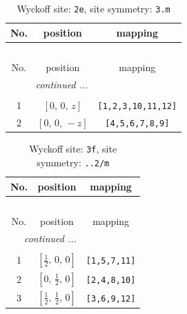 \documentclass[fleqn,8pt]{jsarticle}
\begin{document}
\begin{longtable}{ccc}
\caption{Wyckoff site: {\tt 2e}, site symmetry: {\tt 3.m}}
 \\
 \hline \hline
No. & position & mapping \\ \hline \endfirsthead

\multicolumn{2}{l}{\tablename\ \thetable{}} \\
 \hline \hline
No. & position & mapping \\ \hline \endhead

 \hline \hline
\multicolumn{2}{r}{\footnotesize\it continued ...} \\ \endfoot

 \hline \hline
\multicolumn{2}{r}{} \\ \endlastfoot

1 & $\left[ 0,\, 0,\, z \right]$ & {\tt [1,2,3,10,11,12]} \\ \hline
2 & $\left[ 0,\, 0,\, - z \right]$ & {\tt [4,5,6,7,8,9]} \\
\end{longtable}
\renewcommand{\arraystretch}{1.2}
\begin{longtable}{ccc}
\caption{Wyckoff site: {\tt 3f}, site symmetry: {\tt ..2/m}}
 \\
 \hline \hline
No. & position & mapping \\ \hline \endfirsthead

\multicolumn{2}{l}{\tablename\ \thetable{}} \\
 \hline \hline
No. & position & mapping \\ \hline \endhead

 \hline \hline
\multicolumn{2}{r}{\footnotesize\it continued ...} \\ \endfoot

 \hline \hline
\multicolumn{2}{r}{} \\ \endlastfoot

1 & $\left[ \frac{1}{2},\, 0,\, 0 \right]$ & {\tt [1,5,7,11]} \\ \hline
2 & $\left[ 0,\, \frac{1}{2},\, 0 \right]$ & {\tt [2,4,8,10]} \\ \hline
3 & $\left[ \frac{1}{2},\, \frac{1}{2},\, 0 \right]$ & {\tt [3,6,9,12]} \\
\end{longtable}
\renewcommand{\arraystretch}{1.2}
\end{document}
